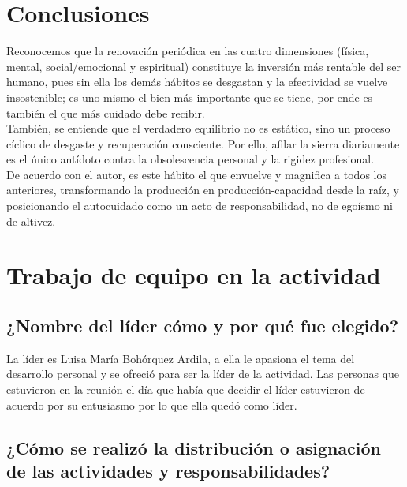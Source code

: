 \documentclass[onecolumn]{article} %
\begin{document}
	
	\section{Conclusiones}
	
	Reconocemos que la renovación periódica en las cuatro dimensiones (física, mental, social/emocional y espiritual) constituye la inversión más rentable del ser humano, pues sin ella los demás hábitos se desgastan y la efectividad se vuelve insostenible; es uno mismo el bien más importante que se tiene, por ende es también el que más cuidado debe recibir.\\
	
	También, se entiende que el verdadero equilibrio no es estático, sino un proceso cíclico de desgaste y recuperación consciente. Por ello, afilar la sierra diariamente es el único antídoto contra la obsolescencia personal y la rigidez profesional.\\
	
	De acuerdo con el autor, es este hábito el que envuelve y magnifica a todos los anteriores, transformando la producción en producción-capacidad desde la raíz, y posicionando el autocuidado como un acto de responsabilidad, no de egoísmo ni de altivez.
	
	\section{Trabajo de equipo en la actividad}
	
	\subsection{¿Nombre del líder cómo y por qué fue elegido?}
	
	La líder es Luisa María Bohórquez Ardila, a ella le apasiona el tema del desarrollo personal y se ofreció para ser la líder de la actividad. Las personas que estuvieron en la reunión el día que había que decidir el líder estuvieron de acuerdo por su entusiasmo por lo que ella quedó como líder.
	
	\subsection{¿Cómo se realizó la distribución o asignación de las actividades y responsabilidades?}
	
\end{document}
